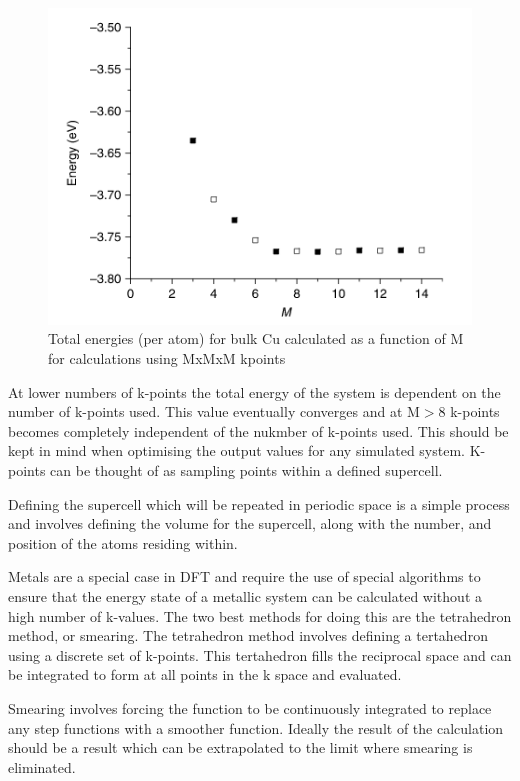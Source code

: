 \begin{figure}[H]
    \includegraphics[width=\linewidth]{figures/convergereal.png}
    \caption{Total energies (per atom) for bulk Cu calculated as a function of M for calculations using MxMxM kpoints \cite{doi:10.1002/9780470447710.ch4}}
    \label{converge}
  \end{figure}

At lower numbers of k-points the total energy of the system is dependent on the number of k-points used. This value eventually converges and at M$>$8 k-points becomes completely independent of the nukmber of k-points used. This should be kept in mind when optimising the output values for any simulated system. K-points can be thought of as sampling points within a defined supercell. \cite{doi:10.1002/9780470447710.ch2}

Defining the supercell which will be repeated in periodic space is a simple process and involves defining the volume for the supercell, along with the number, and position of the atoms residing within. 

Metals are a special case in DFT and require the use of special algorithms to ensure that the energy state of a metallic system can be calculated without a high number of k-values. The two best methods for doing this are the tetrahedron method, or smearing. The tetrahedron method involves defining a tertahedron using a discrete set of k-points. This tertahedron fills the reciprocal space and can be integrated to form at all points in the k space and evaluated. \cite{doi:10.1002/9780470447710.ch2}

Smearing involves forcing the function to be continuously integrated to replace any step functions with a smoother function. Ideally the result of the calculation should be a result which can be extrapolated to the limit where smearing is eliminated. \cite{doi:10.1002/9780470447710.ch2}

